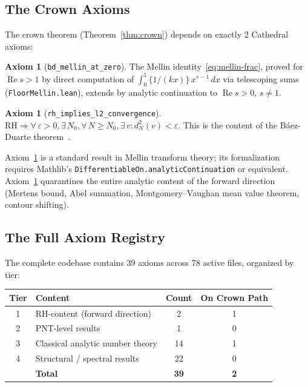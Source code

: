 \documentclass[11pt,a4paper]{article}
\theoremstyle{plain}
\theoremstyle{definition}
\newtheorem{axiombox}[theorem]{Axiom}
\theoremstyle{remark}
\newcommand{\RH}{\mathrm{RH}}
\newcommand{\re}{\operatorname{Re}}
\newcommand{\fract}[1]{\{#1\}}
\newcommand{\lean}[1]{\texttt{#1}}
\begin{document}
\subsection{The Crown Axioms}

The crown theorem (Theorem~\ref{thm:crown}) depends on exactly 2
Cathedral axioms:

\begin{axiombox}[\lean{bd\_mellin\_at\_zero}]
\label{ax:mellin}
The Mellin identity~\eqref{eq:mellin-frac}, proved for $\re s > 1$
by direct computation of $\int_0^1 \fract{1/(kx)}\,x^{s-1}\,dx$
via telescoping sums (\lean{FloorMellin.lean}), extends by analytic
continuation to $\re s > 0$, $s \neq 1$.
\end{axiombox}

\begin{axiombox}[\lean{rh\_implies\_l2\_convergence}]
\label{ax:l2}
$\RH \Rightarrow \forall\,\varepsilon > 0, \exists\,N_0,
\forall\,N \geq N_0, \exists\,v : d_N^2(v) < \varepsilon$.
This is the content of the B\'aez-Duarte theorem~\cite{baezduarte2003}.
\end{axiombox}

Axiom~\ref{ax:mellin} is a standard result in Mellin transform theory;
its formalization requires Mathlib's \lean{DifferentiableOn.analyticContinuation}
or equivalent. Axiom~\ref{ax:l2} quarantines the entire analytic content
of the forward direction (Mertens bound, Abel summation, Montgomery--Vaughan
mean value theorem, contour shifting).

\subsection{The Full Axiom Registry}

The complete codebase contains 39 axioms across 78 active files,
organized by tier:

\begin{center}
\begin{tabular}{@{}clcc@{}}
\toprule
\textbf{Tier} & \textbf{Content} & \textbf{Count} & \textbf{On Crown Path} \\
\midrule
1 & RH-content (forward direction) & 2 & 1 \\
2 & PNT-level results & 1 & 0 \\
3 & Classical analytic number theory & 14 & 1 \\
4 & Structural / spectral results & 22 & 0 \\
\midrule
& \textbf{Total} & \textbf{39} & \textbf{2} \\
\bottomrule
\end{tabular}
\end{center}
\end{document}
